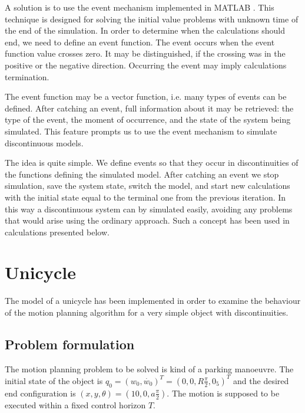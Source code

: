 A solution is to use the event mechanism implemented in MATLAB \cite{events}.
This technique is designed for solving the initial value problems with unknown time of
the end of the simulation. In order to determine when the calculations should end,
we need to define an event function. The event occurs when the event function value
crosses zero. It may be distinguished, if the crossing was in the positive or the negative direction.
Occurring the event may imply calculations termination. 

The event function may be a vector function, i.e. many types of events can be defined. After catching
an event, full information about it may be retrieved: the type of the event, the moment of occurrence,
and the state of the system being simulated. This feature prompts us to use the event mechanism
to simulate discontinuous models.

The idea is quite simple. We define events so that they occur in discontinuities of the
functions defining the simulated model. After catching
an event we stop simulation, save the system state, switch the model, and start new
calculations with the initial state equal to the terminal one from the previous iteration.
In this way a discontinuous system can by simulated easily, avoiding any problems that would
arise using the ordinary approach. Such a concept has been used in calculations presented below.


\section{Unicycle}
The model of a unicycle has been implemented in order to examine the behaviour
of the motion planning algorithm for a very simple object with discontinuities. 

\subsection{Problem formulation}
The motion planning problem to be solved is kind of a parking manoeuvre. The initial
state of the object is $q_0 = (w_0, \dot{w_0})^T = (0, 0, R\frac{\pi}{2}, 0_5)^T$
and the desired end configuration is $(x, y, \theta) = (10, 0, a\frac{\pi}{2})$.
The motion is supposed to be executed within a fixed control horizon $T$.

